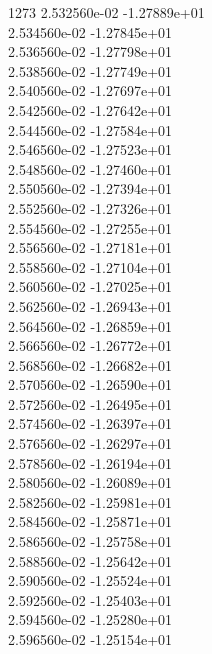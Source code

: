 1273	2.532560e-02	-1.27889e+01	\\ 	2.534560e-02	-1.27845e+01	\\ 	2.536560e-02	-1.27798e+01	\\ 	2.538560e-02	-1.27749e+01	\\ 	2.540560e-02	-1.27697e+01	\\ 	2.542560e-02	-1.27642e+01	\\ 	2.544560e-02	-1.27584e+01	\\ 	2.546560e-02	-1.27523e+01	\\ 	2.548560e-02	-1.27460e+01	\\ 	2.550560e-02	-1.27394e+01	\\ 	2.552560e-02	-1.27326e+01	\\ 	2.554560e-02	-1.27255e+01	\\ 	2.556560e-02	-1.27181e+01	\\ 	2.558560e-02	-1.27104e+01	\\ 	2.560560e-02	-1.27025e+01	\\ 	2.562560e-02	-1.26943e+01	\\ 	2.564560e-02	-1.26859e+01	\\ 	2.566560e-02	-1.26772e+01	\\ 	2.568560e-02	-1.26682e+01	\\ 	2.570560e-02	-1.26590e+01	\\ 	2.572560e-02	-1.26495e+01	\\ 	2.574560e-02	-1.26397e+01	\\ 	2.576560e-02	-1.26297e+01	\\ 	2.578560e-02	-1.26194e+01	\\ 	2.580560e-02	-1.26089e+01	\\ 	2.582560e-02	-1.25981e+01	\\ 	2.584560e-02	-1.25871e+01	\\ 	2.586560e-02	-1.25758e+01	\\ 	2.588560e-02	-1.25642e+01	\\ 	2.590560e-02	-1.25524e+01	\\ 	2.592560e-02	-1.25403e+01	\\ 	2.594560e-02	-1.25280e+01	\\ 	2.596560e-02	-1.25154e+01	\\ \hline
